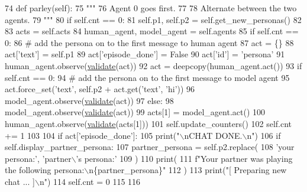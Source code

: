 \begin{DoxyCode}
74     \textcolor{keyword}{def }parley(self):
75         \textcolor{stringliteral}{"""}
76 \textcolor{stringliteral}{        Agent 0 goes first.}
77 \textcolor{stringliteral}{}
78 \textcolor{stringliteral}{        Alternate between the two agents.}
79 \textcolor{stringliteral}{        """}
80         \textcolor{keywordflow}{if} self.cnt == 0:
81             self.p1, self.p2 = self.get\_new\_personas()
82 
83         acts = self.acts
84         human\_agent, model\_agent = self.agents
85         \textcolor{keywordflow}{if} self.cnt == 0:
86             \textcolor{comment}{# add the persona on to the first message to human agent}
87             act = \{\}
88             act[\textcolor{stringliteral}{'text'}] = self.p1
89             act[\textcolor{stringliteral}{'episode\_done'}] = \textcolor{keyword}{False}
90             act[\textcolor{stringliteral}{'id'}] = \textcolor{stringliteral}{'persona'}
91             human\_agent.observe(\hyperlink{namespaceparlai_1_1core_1_1worlds_afc3fad603b7bce41dbdc9cdc04a9c794}{validate}(act))
92         act = deepcopy(human\_agent.act())
93         \textcolor{keywordflow}{if} self.cnt == 0:
94             \textcolor{comment}{# add the persona on to the first message to model agent}
95             act.force\_set(\textcolor{stringliteral}{'text'}, self.p2 + act.get(\textcolor{stringliteral}{'text'}, \textcolor{stringliteral}{'hi'}))
96             model\_agent.observe(\hyperlink{namespaceparlai_1_1core_1_1worlds_afc3fad603b7bce41dbdc9cdc04a9c794}{validate}(act))
97         \textcolor{keywordflow}{else}:
98             model\_agent.observe(\hyperlink{namespaceparlai_1_1core_1_1worlds_afc3fad603b7bce41dbdc9cdc04a9c794}{validate}(act))
99         acts[1] = model\_agent.act()
100         human\_agent.observe(\hyperlink{namespaceparlai_1_1core_1_1worlds_afc3fad603b7bce41dbdc9cdc04a9c794}{validate}(acts[1]))
101         self.update\_counters()
102         self.cnt += 1
103 
104         \textcolor{keywordflow}{if} act[\textcolor{stringliteral}{'episode\_done'}]:
105             print(\textcolor{stringliteral}{"\(\backslash\)nCHAT DONE.\(\backslash\)n"})
106             \textcolor{keywordflow}{if} self.display\_partner\_persona:
107                 partner\_persona = self.p2.replace(
108                     \textcolor{stringliteral}{'your persona:'}, \textcolor{stringliteral}{'partner\(\backslash\)'s persona:'}
109                 )
110                 print(
111                     f\textcolor{stringliteral}{"Your partner was playing the following persona:\(\backslash\)n\{partner\_persona\}"}
112                 )
113             print(\textcolor{stringliteral}{"[ Preparing new chat ... ]\(\backslash\)n"})
114             self.cnt = 0
115 
116 
\end{DoxyCode}



